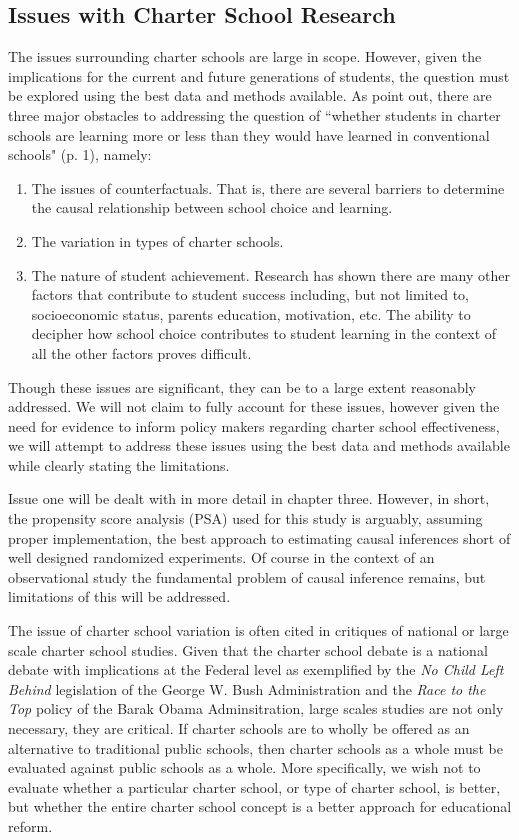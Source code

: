 \documentclass[letterpaper,12p,twoside]{article} %
\begin{document}
\subsection{Issues with Charter School Research}
The issues surrounding charter schools are large in scope. However, given the implications for the current and future generations of students, the question must be explored using the best data and methods available. As  point out, there are three major obstacles to addressing the question of ``whether students in charter schools are learning more or less than they would have learned in conventional schools" (p. 1), namely:

\begin{enumerate}
\item The issues of counterfactuals. That is, there are several barriers to determine the causal relationship between school choice and learning.
\item The variation in types of charter schools.
\item The nature of student achievement. Research has shown there are many other factors that contribute to student success including, but not limited to, socioeconomic status, parents education, motivation, etc. The ability to decipher how school choice contributes to student learning in the context of all the other factors proves difficult.
\end{enumerate}

Though these issues are significant, they can be to a large extent reasonably addressed. We will not claim to fully account for these issues, however given the need for evidence to inform policy makers regarding charter school effectiveness, we will attempt to address these issues using the best data and methods available while clearly stating the limitations.

Issue one will be dealt with in more detail in chapter three. However, in short, the propensity score analysis (PSA) used for this study is arguably, assuming proper implementation, the best approach to estimating causal inferences short of well designed randomized experiments. Of course in the context of an observational study the fundamental problem of causal inference  remains, but limitations of this will be addressed.

The issue of charter school variation is often cited in critiques of national or large scale charter school studies. Given that the charter school debate is a national debate with implications at the Federal level as exemplified by the \textit{No Child Left Behind} legislation of the George W. Bush Administration and the \textit{Race to the Top} policy of the Barak Obama Adminsitration, large scales studies are not only necessary, they are critical. If charter schools are to wholly be offered as an alternative to traditional public schools, then charter schools as a whole must be evaluated against public schools as a whole. More specifically, we wish not to evaluate whether a particular charter school, or type of charter school, is better, but whether the entire charter school concept is a better approach for educational reform.
\end{document}

